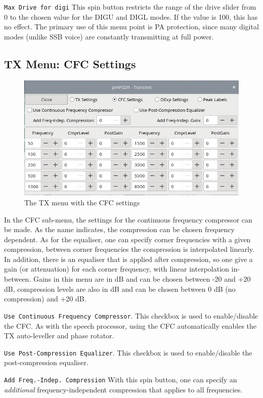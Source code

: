 \documentclass[12pt]{book}
\def\rett#1{\texttt{\color{red}#1}}
\begin{document}
\rett{Max Drive for digi} This spin button restricts the range of the drive slider from 0 to the
chosen value
for the DIGU and DIGL modes. If the value is 100, this has no effect. The primary use of this menu point is
PA protection,
since many digital modes (unlike SSB voice) are constantly transmitting at full power.

\subsection{TX Menu: CFC Settings}

\begin{figure}[ht]
\center
\includegraphics[width=12cm]{TX_CFC.png}
\caption{The TX menu with the CFC settings}
\label{fig:CFCmenu}
\end{figure}

In the CFC sub-menu, the settings for the continuous frequency compressor can be made.
As the name indicates, the compression can be chosen frequency dependent. As for the
equaliser, one can specify corner frequencies with a given compression, between corner
frequencies the compression is interpolated linearly. In addition, there is an equaliser that
is applied after compression, so one give a gain (or attenuation) for each corner
frequency, with linear interpolation in-between. Gains in this menu are in dB and
can be chosen between -20 and +20 dB, compression levels are also in dB and can be chosen
between 0 dB (no compression) and +20 dB.

\rett{Use Continuous Frequency Compressor}. This checkbox is used to enable/disable the CFC. As with
the speech processor, using the CFC automatically enables the TX auto-leveller and phase rotator.

\rett{Use Post-Compression Equalizer}. This checkbox is used  to enable/disable the post-compression
equaliser.

\rett{Add Freq.-Indep. Compression} With this spin button, one can specify an \textit{additional}
frequency-independent compression that applies to all frequencies.
\end{document}
